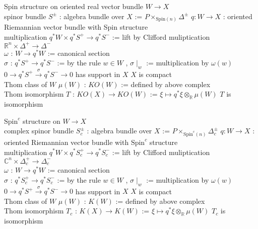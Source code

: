 \begin{Theorem}
\itemdefi
  \For Spin structure on oriented real vector bundle \(W \to X\) \\
  \Define spinor bundle \(S^{\pm}\) : algebra bundle over \(X\) := \(P \times_{\text{Spin}(n)} \Delta^{\pm}\)
\itemdefi
  \For \(q : W \to X\) : oriented Riemannian vector bundle with Spin structure \\
  \Define multiplication \(q^* W \times q^* {S^+} \to q^*{S^-}\) := lift by Clifford muliptication \(\mathbb{R}^n \times \Delta^+ \to \Delta^-\) \\
  \Define \(\omega\) : \(W \to q^* W\) := canonical section \\
  \Define \(\sigma\) : \(q^* {S^+} \to q^* {S^-}\) := by the rule \(w \in W\) , \(\sigma\mid_w\) := multiplication by \(\omega(w)\)
\itemprop
  \Then \(0 \to q^* {S^+} \overset{\sigma}{\to} q^* {S^-} \to 0\) has support in \(X\)
\itemdefi
  \IfHold \(X\) is compact \\
  \Define Thom class of \(W\) \(\mu(W)\) : \(KO(W)\) := defined by above complex \\
  \Define Thom isomorphism \(T\) : \(KO(X) \to KO(W)\) := \(\xi \mapsto q^*\xi \otimes_{\mathbb{R}} \mu(W)\)
\itemprop
  \(T\) is isomorphism
\end{Theorem}

\begin{Theorem}
\itemdefi
  \For \(\text{Spin}^c\) structure on \(W \to X\) \\
  \Define complex spinor bundle \(S_c^{\pm}\) : algebra bundle over \(X\) := \(P \times_{\text{Spin}^c(n)} \Delta_c^{\pm}\)
\itemdefi
  \For \(q : W \to X\) : oriented Riemannian vector bundle with \(\text{Spin}^c\) structure \\
  \Define multiplication \(q^* W \times q^* {S_c^+} \to q^*{S_c^-}\) := lift by Clifford muliptication \(\mathbb{C}^n \times \Delta_c^+ \to \Delta_c^-\) \\
  \Define \(\omega\) : \(W \to q^* W\) := canonical section \\
  \Define \(\sigma\) : \(q^* {S_c^+} \to q^* {S_c^-}\) := by the rule \(w \in W\) , \(\sigma\mid_w\) := multiplication by \(\omega(w)\)
\itemprop
  \Then \(0 \to q^* {S^+} \overset{\sigma}{\to} q^* {S^-} \to 0\) has support in \(X\)
\itemdefi
  \For \(X\) is compact \\
  \Define Thom class of \(W\) \(\mu(W)\) : \(K(W)\) := defined by above complex \\
  \Define Thom isomorphism \(T_c\) : \(K(X) \to K(W)\) := \(\xi \mapsto q^*\xi \otimes_{\mathbb{R}} \mu(W)\)
\itemprop
  \(T_c\) is isomorphism
\end{Theorem}